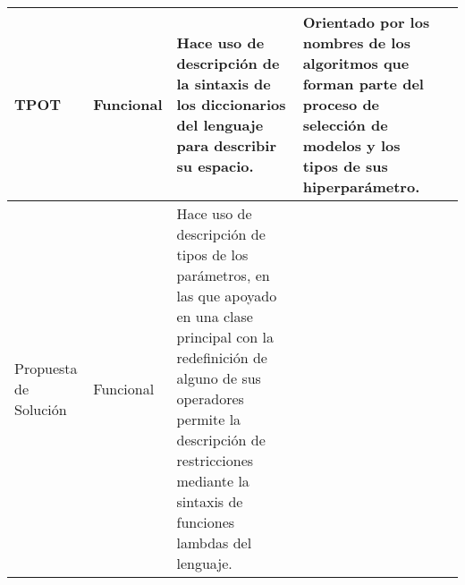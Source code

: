 \begin{longtable}{  p{2.15cm}  p{2.4cm}  p{4.75cm}  p{4.65cm}  p{5.45cm} }
    \hline
    TPOT                                                                                                                                                                                                                                                                                                                         &
    Funcional                                                                                                                                                                                                                                                                                                                    &
    Hace uso de descripción de la sintaxis de los diccionarios del lenguaje para describir su espacio.                                                                                                                                                                                                                            &
    Orientado por los nombres de los algoritmos que forman parte del proceso de selección de modelos y los tipos de sus hiperparámetro.                                                                                                                                                                                          &
    \\
    \hline
    \rowcolor{lavender}
    Propuesta de Solución                                                                                                                                                                                                                                                                                                        &
    Funcional                                                                                                                                                                                                                                                                                                                    &
    Hace uso de descripción de tipos de los parámetros, en las que apoyado en una clase principal con la redefinición de alguno de sus operadores permite la descripción de restricciones mediante la sintaxis de funciones lambdas del lenguaje.                                                                                &

\end{longtable}

